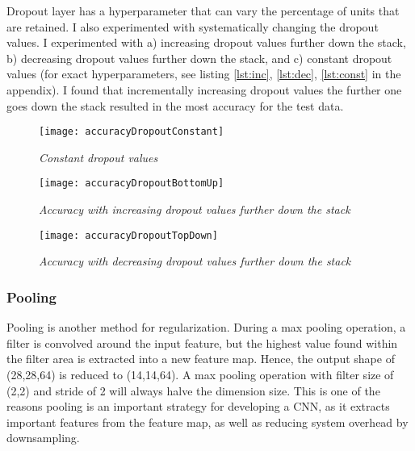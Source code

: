 \documentclass{article}
\begin{document}
Dropout layer has a hyperparameter that can vary the percentage of units that are retained. I also experimented with systematically changing the dropout values. I experimented with a) increasing dropout values further down the stack, b) decreasing dropout values further down the stack, and c) constant dropout values (for exact hyperparameters, see listing \ref{lst:inc}, \ref{lst:dec}, \ref{lst:const} in the appendix). I found that incrementally increasing dropout values the further one goes down the stack resulted in the most accuracy for the test data.

\begin{figure}[H]
    \begin{center}
        \texttt{[image: accuracyDropoutConstant]}
        \caption{\small \sl Constant dropout values}
    \end{center}
\end{figure}

\begin{figure}[H]
    \begin{center}
        \texttt{[image: accuracyDropoutBottomUp]}
        \caption{\small \sl Accuracy with increasing dropout values further down the stack}
    \end{center}
\end{figure}

\begin{figure}[H]
    \begin{center}
        \texttt{[image: accuracyDropoutTopDown]}
        \caption{\small \sl Accuracy with decreasing dropout values further down the stack}
    \end{center}
\end{figure}

\subsubsection{Pooling}

 Pooling is another method for regularization. During a max pooling operation, a filter is convolved around the input feature, but the highest value found within the filter area is extracted into a new feature map. Hence, the output shape of (28,28,64) is reduced to (14,14,64). A max pooling operation with filter size of (2,2) and stride of 2 will always halve the dimension size.\autocite[339]{deep16} This is one of the reasons pooling is an important strategy for developing a CNN, as it extracts important features from the feature map, as well as reducing system overhead by downsampling.
\end{document}
